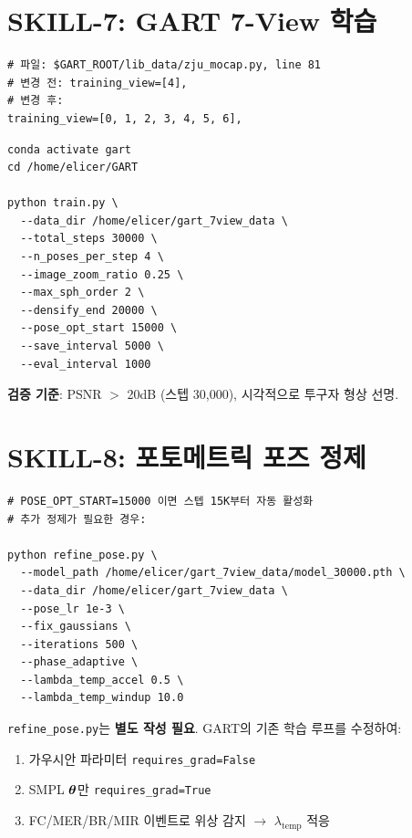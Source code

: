 \documentclass[11pt, a4paper]{report}
\begin{document}
\section{SKILL-7: GART 7-View 학습}

\begin{codebox}[title={GART 코드 수정 (1줄)}]
\begin{verbatim}
# 파일: $GART_ROOT/lib_data/zju_mocap.py, line 81
# 변경 전: training_view=[4],
# 변경 후:
training_view=[0, 1, 2, 3, 4, 5, 6],
\end{verbatim}
\end{codebox}

\begin{codebox}[title={학습 실행}]
\begin{verbatim}
conda activate gart
cd /home/elicer/GART

python train.py \
  --data_dir /home/elicer/gart_7view_data \
  --total_steps 30000 \
  --n_poses_per_step 4 \
  --image_zoom_ratio 0.25 \
  --max_sph_order 2 \
  --densify_end 20000 \
  --pose_opt_start 15000 \
  --save_interval 5000 \
  --eval_interval 1000
\end{verbatim}
\end{codebox}

\textbf{검증 기준}: PSNR $>$ 20dB (스텝 30,000), 시각적으로 투구자 형상 선명.


\section{SKILL-8: 포토메트릭 포즈 정제}

\begin{codebox}[title={GART 내장 포즈 최적화 활용}]
\begin{verbatim}
# POSE_OPT_START=15000 이면 스텝 15K부터 자동 활성화
# 추가 정제가 필요한 경우:

python refine_pose.py \
  --model_path /home/elicer/gart_7view_data/model_30000.pth \
  --data_dir /home/elicer/gart_7view_data \
  --pose_lr 1e-3 \
  --fix_gaussians \
  --iterations 500 \
  --phase_adaptive \
  --lambda_temp_accel 0.5 \
  --lambda_temp_windup 10.0
\end{verbatim}
\end{codebox}

\begin{importantnote}
\texttt{refine\_pose.py}는 \textbf{별도 작성 필요}. GART의 기존 학습 루프를 수정하여:
\begin{enumerate}
\item 가우시안 파라미터 \texttt{requires\_grad=False}
\item SMPL $\bm{\theta}$만 \texttt{requires\_grad=True}
\item FC/MER/BR/MIR 이벤트로 위상 감지 $\to$ $\lambda_{\text{temp}}$ 적응
\end{enumerate}
\end{importantnote}
\end{document}
